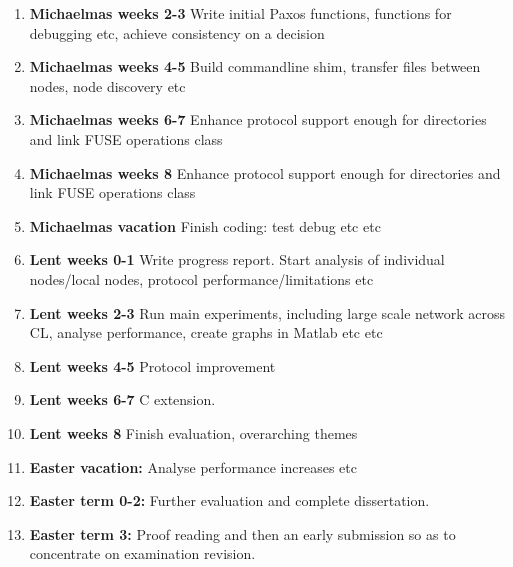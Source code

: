 \begin{enumerate}

\item {\bf Michaelmas weeks 2-3} Write initial Paxos functions, functions for debugging etc,
achieve consistency on a decision

\item {\bf Michaelmas weeks 4-5} Build commandline shim, transfer files between nodes, node
discovery etc

\item {\bf Michaelmas weeks 6-7} Enhance protocol support enough for directories and link FUSE
operations class

\item {\bf Michaelmas weeks 8} Enhance protocol support enough for directories and link FUSE
operations class

\item {\bf Michaelmas vacation} Finish coding: test debug etc etc

\item {\bf Lent weeks 0-1} Write progress report. Start analysis of individual nodes/local nodes,
protocol performance/limitations etc

\item {\bf Lent weeks 2-3} Run main experiments, including large scale network across CL, analyse
performance, create graphs in Matlab etc etc

\item {\bf Lent weeks 4-5} Protocol improvement

\item {\bf Lent weeks 6-7} C extension.

\item {\bf Lent weeks 8} Finish evaluation, overarching themes

\item {\bf Easter vacation:} Analyse performance increases etc

\item {\bf Easter term 0-2:}  Further evaluation and complete dissertation.

\item {\bf Easter term 3:} Proof reading and then an early submission so as to concentrate on examination revision.

\end{enumerate}
